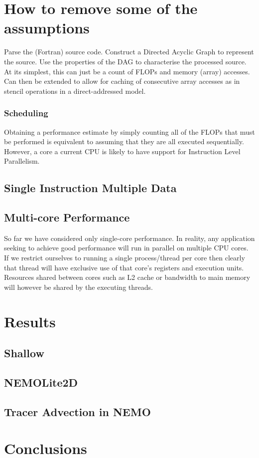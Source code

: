 \documentclass[12pt]{article}
\begin{document}
\section{How to remove some of the assumptions}

Parse the (Fortran) source code.  Construct a Directed Acyclic Graph
to represent the source.  Use the properties of the DAG to
characterise the processed source.  At its simplest, this can just be
a count of FLOPs and memory (array) accesses.  Can then be extended to
allow for caching of consecutive array accesses as in stencil
operations in a direct-addressed model.

\subsubsection{Scheduling}

Obtaining a performance estimate by simply counting all of the FLOPs
that must be performed is equivalent to assuming that they are all
executed sequentially. However, a core a current CPU is likely to have
support for Instruction Level Parallelism.

\subsection{Single Instruction Multiple Data}

\subsection{Multi-core Performance}

So far we have considered only single-core performance. In reality,
any application seeking to achieve good performance will run in
parallel on multiple CPU cores.  If we restrict ourselves to running a
single process/thread per core then clearly that thread will have
exclusive use of that core's registers and execution units. Resources
shared between cores such as L2 cache or bandwidth to main memory will
however be shared by the executing threads.

\section{Results}

\subsection{Shallow}

\subsection{NEMOLite2D}

\subsection{Tracer Advection in NEMO}

\section{Conclusions}



\end{document}
